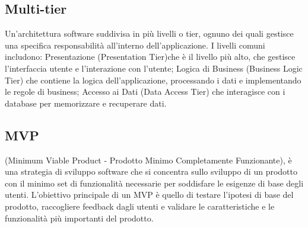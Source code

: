 \subsection*{Multi-tier} 
Un'architettura software suddivisa in più livelli o tier, ognuno dei quali gestisce una specifica responsabilità all'interno dell'applicazione. I livelli comuni includono: Presentazione (Presentation Tier)che è il livello più alto, che gestisce l'interfaccia utente e l'interazione con l'utente; Logica di Business (Business Logic Tier) che contiene la logica dell'applicazione, processando i dati e implementando le regole di business; Accesso ai Dati (Data Access Tier) che interagisce con i database per memorizzare e recuperare dati.
\subsection*{MVP} 
(Minimum Viable Product - Prodotto Minimo Completamente Funzionante), è una strategia di sviluppo software che si concentra sullo sviluppo di un prodotto con il minimo set di funzionalità necessarie per soddisfare le esigenze di base degli utenti. L'obiettivo principale di un MVP è quello di testare l'ipotesi di base del prodotto, raccogliere feedback dagli utenti e validare le caratteristiche e le funzionalità più importanti del prodotto.
